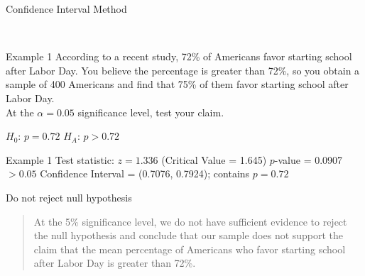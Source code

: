 \documentclass[t]{beamer}
\begin{document}
\begin{frame}{Confidence Interval Method}
\begin{center}
\newline\\
\end{center}
\end{frame}

\begin{frame}{Example 1}
According to a recent study, 72\% of Americans favor starting school after Labor Day. You believe the percentage is greater than 72\%, so you obtain a sample of 400 Americans and find that 75\% of them favor starting school after Labor Day. \newline\\

At the $\alpha = 0.05$ significance level, test your claim.	\newline\\	\pause

$H_0: \, p = 0.72$ \newline
$H_A: \, p > 0.72$
\end{frame}

\begin{frame}{Example 1}
Test statistic: $z = 1.336$ (Critical Value = 1.645) \newline
$p$-value = 0.0907 $> 0.05$	\newline
Confidence Interval = (0.7076, 0.7924); contains $p = 0.72$	\newline\\	\pause

Do not reject null hypothesis	\newline\\	\pause

\begin{quote}
At the 5\% significance level, we do not have sufficient evidence to reject the null hypothesis and conclude that our sample does not support the claim that the mean percentage of Americans who favor starting school after Labor Day is greater than 72\%.
\end{quote}
\end{frame}
\end{document}
